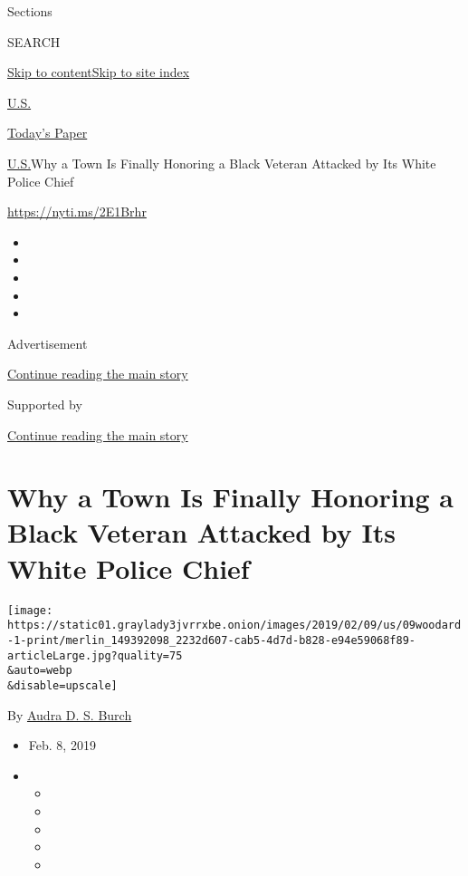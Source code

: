 Sections

SEARCH

\protect\hyperlink{site-content}{Skip to
content}\protect\hyperlink{site-index}{Skip to site index}

\href{https://www.nytimes3xbfgragh.onion/section/us}{U.S.}

\href{https://myaccount.nytimes3xbfgragh.onion/auth/login?response_type=cookie\&client_id=vi}{}

\href{https://www.nytimes3xbfgragh.onion/section/todayspaper}{Today's
Paper}

\href{/section/us}{U.S.}\textbar{}Why a Town Is Finally Honoring a Black
Veteran Attacked by Its White Police Chief

\url{https://nyti.ms/2E1Brhr}

\begin{itemize}
\item
\item
\item
\item
\item
\end{itemize}

Advertisement

\protect\hyperlink{after-top}{Continue reading the main story}

Supported by

\protect\hyperlink{after-sponsor}{Continue reading the main story}

\hypertarget{why-a-town-is-finally-honoring-a-black-veteran-attacked-by-its-white-police-chief}{%
\section{Why a Town Is Finally Honoring a Black Veteran Attacked by Its
White Police
Chief}\label{why-a-town-is-finally-honoring-a-black-veteran-attacked-by-its-white-police-chief}}

\texttt{[image: https://static01.graylady3jvrrxbe.onion/images/2019/02/09/us/09woodard-1-print/merlin\_149392098\_2232d607-cab5-4d7d-b828-e94e59068f89-articleLarge.jpg?quality=75\\\&auto=webp\\\&disable=upscale]}

By \href{https://www.nytimes3xbfgragh.onion/by/audra-d-s-burch}{Audra D.
S. Burch}

\begin{itemize}
\item
  Feb. 8, 2019
\item
  \begin{itemize}
  \item
  \item
  \item
  \item
  \item
  \end{itemize}
\end{itemize}

